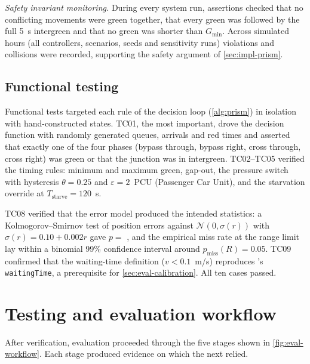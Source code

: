 \textit{Safety invariant monitoring.} During every system run, assertions checked that no conflicting movements were green together, that every green was followed by the full 5~s intergreen and that no green was shorter than $G_{\min}$. Across  simulated hours (all controllers, scenarios, seeds and sensitivity runs)  violations and  \sumo{} collisions were recorded, supporting the safety argument of \cref{sec:impl-prism}.

\subsection{Functional testing}\label{sec:eval-functional}

Functional tests targeted each rule of the decision loop (\cref{alg:prism}) in isolation with hand-constructed states. TC01, the most important, drove the decision function with randomly generated queues, arrivals and red times and asserted that exactly one of the four phases (bypass through, bypass right, cross through, cross right) was green or that the junction was in intergreen. TC02--TC05 verified the timing rules: minimum and maximum green, gap-out, the pressure switch with hysteresis $\theta = 0.25$ and $\varepsilon = 2$~PCU (Passenger Car Unit), and the starvation override at $T_{\text{starve}} = 120$~s.

TC08 verified that the \vls{} error model produced the intended statistics: a Kolmogorov--Smirnov test of position errors against $\mathcal{N}(0, \sigma(r))$ with $\sigma(r) = 0.10 + 0.002r$ gave $p =$ , and the empirical miss rate at the range limit lay within a binomial 99\% confidence interval around $p_{\text{miss}}(R) = 0.05$. TC09 confirmed that the \dtx{} waiting-time definition ($v < 0.1$~m/s) reproduces \sumo{}'s \texttt{waitingTime}, a prerequisite for \cref{sec:eval-calibration}. All ten cases passed.

\section{Testing and evaluation workflow}\label{sec:eval-workflow}

After verification, evaluation proceeded through the five stages shown in \cref{fig:eval-workflow}. Each stage produced evidence on which the next relied.

